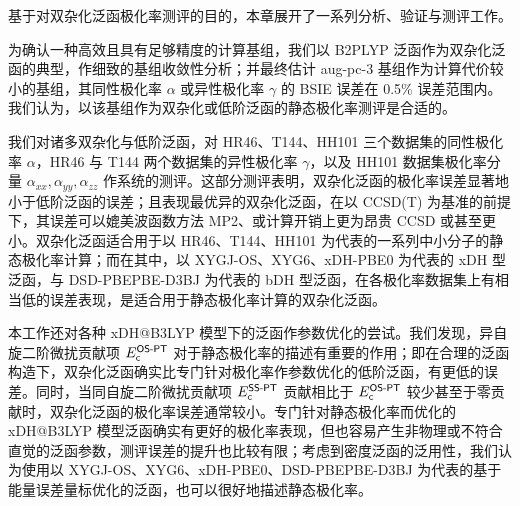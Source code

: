 基于对双杂化泛函极化率测评的目的，本章展开了一系列分析、验证与测评工作。

为确认一种高效且具有足够精度的计算基组，我们以 B2PLYP 泛函作为双杂化泛函的典型，作细致的基组收敛性分析；并最终估计 aug-pc-3 基组作为计算代价较小的基组，其同性极化率 $\alpha$ 或异性极化率 $\gamma$ 的 BSIE 误差在 0.5\% 误差范围内。我们认为，以该基组作为双杂化或低阶泛函的静态极化率测评是合适的。

我们对诸多双杂化与低阶泛函，对 HR46、T144、HH101 三个数据集的同性极化率 $\alpha$，HR46 与 T144 两个数据集的异性极化率 $\gamma$，以及 HH101 数据集极化率分量 $\alpha_{xx}, \alpha_{yy}, \alpha_{zz}$ 作系统的测评。这部分测评表明，双杂化泛函的极化率误差显著地小于低阶泛函的误差；且表现最优异的双杂化泛函，在以 CCSD(T) 为基准的前提下，其误差可以媲美波函数方法 MP2、或计算开销上更为昂贵 CCSD 或甚至更小。双杂化泛函适合用于以 HR46、T144、HH101 为代表的一系列中小分子的静态极化率计算；而在其中，以 XYGJ-OS、XYG6、xDH-PBE0 为代表的 xDH 型泛函，与 DSD-PBEPBE-D3BJ 为代表的 bDH 型泛函，在各极化率数据集上有相当低的误差表现，是适合用于静态极化率计算的双杂化泛函。

本工作还对各种 xDH@B3LYP 模型下的泛函作参数优化的尝试。我们发现，异自旋二阶微扰贡献项 $E_{\textsf{c}}^{\textsf{OS-PT}}$ 对于静态极化率的描述有重要的作用；即在合理的泛函构造下，双杂化泛函确实比专门针对极化率作参数优化的低阶泛函，有更低的误差。同时，当同自旋二阶微扰贡献项 $E_{\textsf{c}}^{\textsf{SS-PT}}$ 贡献相比于 $E_{\textsf{c}}^{\textsf{OS-PT}}$ 较少甚至于零贡献时，双杂化泛函的极化率误差通常较小。专门针对静态极化率而优化的 xDH@B3LYP 模型泛函确实有更好的极化率表现，但也容易产生非物理或不符合直觉的泛函参数，测评误差的提升也比较有限；考虑到密度泛函的泛用性，我们认为使用以 XYGJ-OS、XYG6、xDH-PBE0、DSD-PBEPBE-D3BJ 为代表的基于能量误差量标优化的泛函，也可以很好地描述静态极化率。